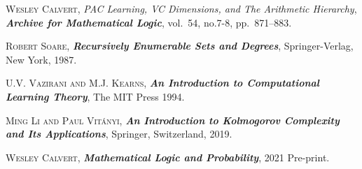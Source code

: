 \documentclass[bsl,meeting]{asl}
\begin{document}
\begin{thebibliography}{10}



{\scshape Wesley Calvert},
{\itshape PAC Learning, VC Dimensions, and The Arithmetic Hierarchy},
{\bfseries\itshape Archive for Mathematical Logic},
vol.~54, no.7-8, pp.~871--883.



{\scshape Robert Soare}, 
{\bfseries\itshape Recursively Enumerable Sets and Degrees},
Springer-Verlag,
New York,
1987.

{\scshape U.V. Vazirani and M.J. Kearns}, 
{\bfseries\itshape An Introduction to Computational Learning Theory},
The MIT Press
1994.

{\scshape Ming Li and Paul Vitányi}, 
{\bfseries\itshape An Introduction to Kolmogorov Complexity and Its Applications},
Springer,
Switzerland,
2019.

{\scshape Wesley Calvert}, 
{\bfseries\itshape Mathematical Logic and Probability},
2021 Pre-print.



\end{thebibliography}


\vspace*{-0.5\baselineskip}
\end{document}
